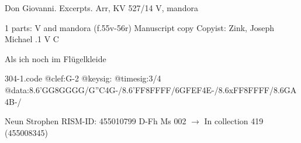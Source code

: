 \documentclass[twocolumn]{book}
\begin{document}
\newline Don Giovanni. Excerpts. Arr, KV 527/14
\newline V, mandora
\newline \begin{itshape}\end{itshape} 
\newline \textcolor{darkblue}{}  1 parts: V and mandora  (f.55v-56r)
\newline Manuscript copy
\newline Copyist: Zink, Joseph Michael
.1  V  C
\newline \begin{footnotesize} Als ich noch im Flügelkleide \end{footnotesize}  
\begin{filecontents*}{304-1.code}
@clef:G-2
@keysig:
@timesig:3/4
@data:8.6'GG8GGGG/{G''C}4G-/8.6'FF8FFFF/{6GFEF}4E-/8.6xFF8FFFF/{8.6GA}4B-/
\end{filecontents*}
\newline
%

\newline Neun Strophen
\newline RISM-ID: 455010799
\newline D-Fh  Ms 002
\newline $\rightarrow$ In collection 419 (455008345)
      
\end{document}
